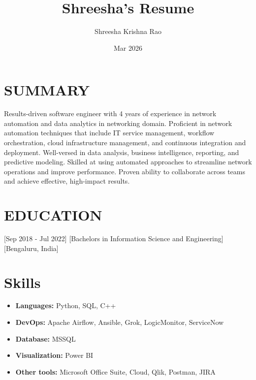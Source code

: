 \documentclass{article}
\title{Shreesha's Resume}
\author{Shreesha Krishna Rao}
\date{Mar 2026}
\begin{document}

\makecvtitle %

\section{SUMMARY}
Results-driven software engineer with 4 years of experience in network automation and data analytics in networking domain. Proficient in network automation techniques that include IT service management, workflow orchestration, cloud infrastructure management, and continuous integration and deployment. Well-versed in data analysis, business intelligence, reporting, and predictive modeling. Skilled at using automated approaches to streamline network operations and improve performance. Proven ability to collaborate across teams and achieve effective, high-impact results.





\section{EDUCATION}

[Sep 2018 - Jul 2022]
[Bachelors in Information Science  and Engineering][\normalfont Bengaluru, India] 

 
\section{Skills}

\begin{itemize}
\item[] \textbf{Languages:} Python, SQL, C++
\item[] \textbf{DevOps:} Apache Airflow, Ansible, Grok, LogicMonitor, ServiceNow
\item[] \textbf{Database: } MSSQL
\item[] \textbf{Visualization: } Power BI
\item[] \textbf{Other tools: } Microsoft Office Suite, Cloud, Qlik, Postman, JIRA

\end{itemize}
\end{document}
